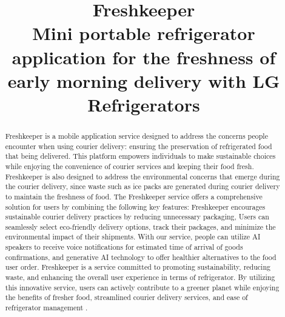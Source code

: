 \documentclass[conference]{IEEEtran}
\begin{document}
\title{Freshkeeper\\
{\footnotesize \large Mini portable refrigerator application for the freshness of early morning delivery with LG Refrigerators}}

\author{
\and
{}
\and
{}
}
\maketitle

\begin{abstract}
Freshkeeper is a mobile application service designed to address the concerns people encounter when using courier delivery: ensuring the preservation of refrigerated food that being delivered. This platform empowers individuals to make sustainable choices while enjoying the convenience of courier services and keeping their food fresh. Freshkeeper is also designed to address the environmental concerns that emerge during the courier delivery, since waste such as ice packs are generated during courier delivery to maintain the freshness of food. The Freshkeeper service offers a comprehensive solution for users by combining the following key features: Freshkeeper encourages sustainable courier delivery practices by reducing unnecessary packaging,  Users can seamlessly select eco-friendly delivery options, track their packages, and minimize the environmental impact of their shipments. With our service, people can utilize AI speakers to receive voice notifications for estimated time of arrival of goods confirmations, and generative AI technology to offer healthier alternatives to the food user order. 
Freshkeeper is a service committed to promoting sustainability, reducing waste, and enhancing the overall user experience in terms of refrigerator. By utilizing this innovative service, users can actively contribute to a greener planet while enjoying the benefits of fresher food, streamlined courier delivery services, and ease of refrigerator management .  

\end{abstract}
\end{document}
